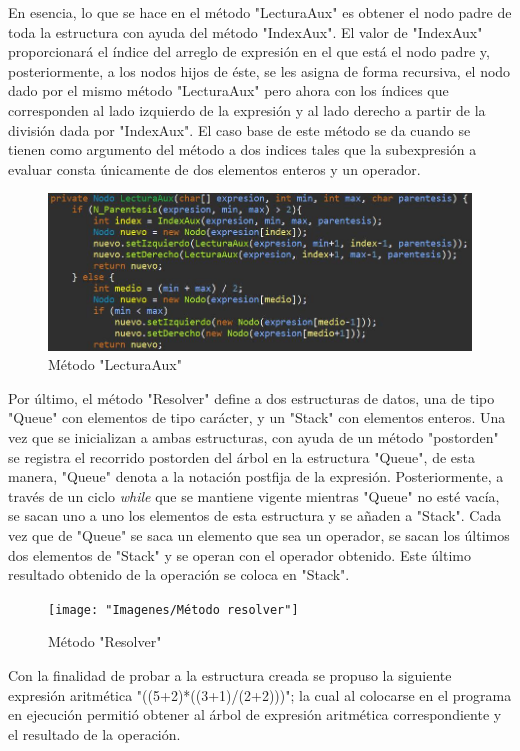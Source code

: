 \documentclass[letterpaper, 11pt]{article}
\begin{document}
	En esencia, lo que se hace en el método "LecturaAux" es obtener el nodo padre de toda la estructura con ayuda del método "IndexAux". El valor de "IndexAux" proporcionará el índice del arreglo de expresión en el que está el nodo padre y, posteriormente, a los nodos hijos de éste, se les asigna de forma recursiva, el nodo dado por el mismo método "LecturaAux" pero ahora con los índices que corresponden al lado izquierdo de la expresión y al lado derecho a partir de la división dada por "IndexAux". El caso base de este método se da cuando se tienen como argumento del método a dos indices tales que la subexpresión a evaluar consta únicamente de dos elementos enteros y un operador.  
	
	\begin{figure}[H]
		\centering
		\includegraphics[scale=0.4]{Imagenes/lecturaAux}
		\caption{Método "LecturaAux"}
	\end{figure}
	
	Por último, el método "Resolver" define a dos estructuras de datos, una de tipo "Queue" con elementos de tipo carácter, y un "Stack" con elementos enteros. Una vez que se inicializan a ambas estructuras, con ayuda de un método "postorden" se registra el recorrido postorden del árbol en la estructura "Queue", de esta manera, "Queue" denota a la notación postfija de la expresión.
	Posteriormente, a través de un ciclo \textit{while} que se mantiene vigente mientras "Queue" no esté vacía, se sacan uno a uno los elementos de esta estructura y se añaden a "Stack". Cada vez que de "Queue" se saca un elemento que sea un operador, se sacan los últimos dos elementos de "Stack" y se operan con el operador obtenido. Este último resultado obtenido de la operación se coloca  en "Stack".
	
	\begin{figure}[H]
		\centering
		\texttt{[image: "Imagenes/Método resolver"]}
		\caption{Método "Resolver"}
	\end{figure}
	
	Con la finalidad de probar a la estructura creada se propuso la siguiente expresión aritmética "((5+2)*((3+1)/(2+2)))"; la cual al colocarse en el programa en ejecución permitió obtener al árbol de expresión aritmética correspondiente y el resultado de la operación.
	
\end{document}
